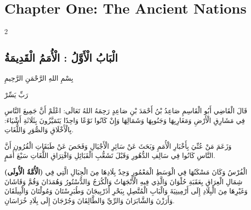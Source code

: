 \documentclass[11pt,a4paper]{article}
\newcommand{\ar}[1]{\arabicfont\beginR #1\endR}
\begin{document}
\clearpage

\section*{Chapter One: The Ancient Nations}

\begin{paracol}{2}
\sloppy

\begin{leftcolumn}
\subsection*{\ar{الْبَابُ الْأَوَّلُ : الْأُمَمُ الْقَدِيمَةُ}}
\vspace{0.3cm}
{\arabicfont\beginR
بِسْمِ اللهِ الرَّحْمَنِ الرَّحِيمِ
\endR}

\vspace{0.2cm}
{\arabicfont\beginR
رَبِّ يَسِّرْ
\endR}

\vspace{0.4cm}
{\arabicfont\beginR
قَالَ الْقَاضِي أَبُو الْقَاسِمِ صَاعِدُ بْنُ أَحْمَدَ بْنِ صَاعِدٍ رَحِمَهُ اللهُ تَعَالَى: اعْلَمْ أَنَّ جَمِيعَ النَّاسِ فِي مَشَارِقِ الْأَرْضِ وَمَغَارِبِهَا وَجَنُوبِهَا وَشَمَالِهَا وَإِنْ كَانُوا نَوْعًا وَاحِدًا يَتَمَيَّزُونَ بِثَلَاثَةِ أَشْيَاءَ: بِالْأَخْلَاقِ وَالصُّوَرِ وَاللُّغَاتِ.
\endR}

\vspace{0.3cm}
{\arabicfont\beginR
وَزَعَمَ مَنْ عُنِّيَ بِأَخْبَارِ الْأُمَمِ وَبَحَثَ عَنْ سَائِرِ الْأَجْيَالِ وَفَحَصَ عَنْ طَبَقَاتِ الْقُرُونِ أَنَّ النَّاسِ كَانُوا فِي سَالِفِ الدُّهُورِ وَقَبْلَ تَشَعُّبِ الْقَبَائِلِ وَافْتِرَاقِ اللُّغَاتِ سَبْعَ أُمَمٍ.
\endR}

\vspace{0.3cm}
{\arabicfont\beginR
\textbf{(الْأُمَّةُ الْأُولَى)} الْفُرْسُ وَكَانَ مَسْكَنُهَا فِي الْوَسَطِ الْمَعْمُورِ وَحِدٌ بِلَادِهَا مِنَ الْجِبَالِ الَّتِي فِي شِمَالِ الْعِرَاقِ بِعَقَبَةِ حُلْوَانَ وَالَّذِي فِيهِ الْأَنْجَهَاتُ وَالْكُرَجُ وَالدُّسْتُورُ وَهُمَدَانَ وَقُمَّ وَقَاشَانَ وَغَيْرِهَا مِنَ الْبِلَادِ إِلَى أَرْمِينِيَةَ وَالْبَابِ الْمُتَّصِلِ بِبَحْرِ أَذَرْبِيجَانَ وَطُبَرِسْتَانَ وَمُولْتَانَ وَالْبِيلَقَانَ وَأَرَزْنَ وَالشَّابَرَانَ وَالرِّيِّ وَالطَّالِقَانَ وَجُرْجَانَ إِلَى بِلَادِ خُرَاسَانِ.
\endR}
\end{leftcolumn}


\end{paracol}
\end{document}
